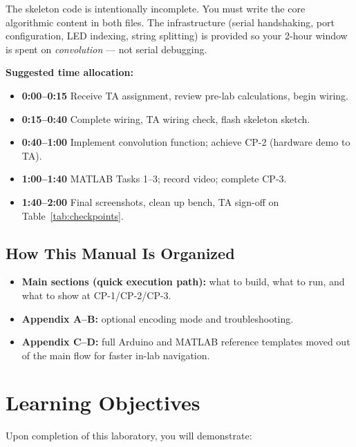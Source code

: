 \documentclass[11pt,letterpaper]{article}
\begin{document}
\noindent The skeleton code is intentionally incomplete. You must write the core algorithmic content in both files. The infrastructure (serial handshaking, port configuration, LED indexing, string splitting) is provided so your 2-hour window is spent on \emph{convolution} --- not serial debugging.

\noindent\textbf{Suggested time allocation:}
\begin{itemize}[nosep]
    \item \textbf{0:00--0:15} \quad Receive TA assignment, review pre-lab calculations, begin wiring.
    \item \textbf{0:15--0:40} \quad Complete wiring, TA wiring check, flash skeleton sketch.
    \item \textbf{0:40--1:00} \quad Implement convolution function; achieve CP-2 (hardware demo to TA).
    \item \textbf{1:00--1:40} \quad MATLAB Tasks 1--3; record video; complete CP-3.
    \item \textbf{1:40--2:00} \quad Final screenshots, clean up bench, TA sign-off on Table~\ref{tab:checkpoints}.
\end{itemize}

\subsection*{How This Manual Is Organized}
\begin{itemize}[nosep]
    \item \textbf{Main sections (quick execution path):} what to build, what to run, and what to show at CP-1/CP-2/CP-3.
    \item \textbf{Appendix A--B:} optional encoding mode and troubleshooting.
    \item \textbf{Appendix C--D:} full Arduino and MATLAB reference templates moved out of the main flow for faster in-lab navigation.
\end{itemize}

\clearpage

\section{Learning Objectives}

Upon completion of this laboratory, you will demonstrate:
\end{document}
